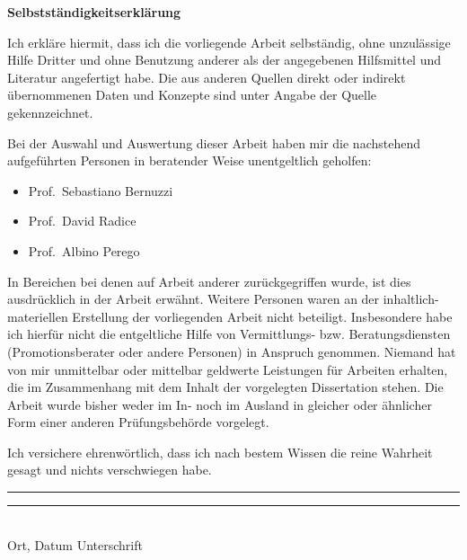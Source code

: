 \documentclass[
openright,
12pt, %
english,%
onehalfspacing, %
nolistspacing, %
nohyperref, %
headsepline, %
]{MastersDoctoralThesis} %
\begin{document}



\newpage 
\thispagestyle{empty}

\begin{Large}
\textbf{Selbstständigkeitserklärung} \\
\end{Large}
\vspace*{0.5cm}
      \noindent

Ich erkläre hiermit, dass ich die vorliegende Arbeit selbständig, ohne
unzulässige Hilfe Dritter und ohne Benutzung anderer als der angegebenen Hilfsmittel 
und Literatur angefertigt habe. Die aus anderen Quellen direkt oder indirekt
übernommenen Daten und Konzepte sind unter Angabe der Quelle gekennzeichnet.

Bei der Auswahl und Auswertung dieser Arbeit haben mir die nachstehend 
aufgeführten Personen in beratender Weise unentgeltlich geholfen:
%
\begin{itemize}
    \setlength{\itemsep}{0pt}
    \item Prof.~Sebastiano Bernuzzi 
    \item Prof.~David Radice
    \item Prof.~Albino Perego
\end{itemize}
%
In Bereichen bei denen auf Arbeit anderer zurückgegriffen wurde, ist dies ausdrücklich in der Arbeit erwähnt. 
Weitere Personen waren an der inhaltlich-materiellen Erstellung der vorliegenden
Arbeit nicht beteiligt. Insbesondere habe ich hierfür nicht die entgeltliche Hilfe von
Vermittlungs- bzw. Beratungsdiensten (Promotionsberater oder andere Personen)
in Anspruch genommen. Niemand hat von mir unmittelbar oder mittelbar geldwerte Leistungen für Arbeiten erhalten, 
die im Zusammenhang mit dem Inhalt der vorgelegten Dissertation stehen.
Die Arbeit wurde bisher weder im In- noch im Ausland in gleicher oder ähnlicher
Form einer anderen Prüfungsbehörde vorgelegt.

Ich versichere ehrenwörtlich, dass ich nach bestem Wissen die reine Wahrheit gesagt und nichts verschwiegen habe.      




\vspace{\fill}
\begin{flushleft}
\rule{5cm}{0.05cm} \hspace{\fill} \rule{5cm}{0.05cm} \\
Ort, Datum  \hspace{\fill} Unterschrift 
\end{flushleft}

\end{document}
